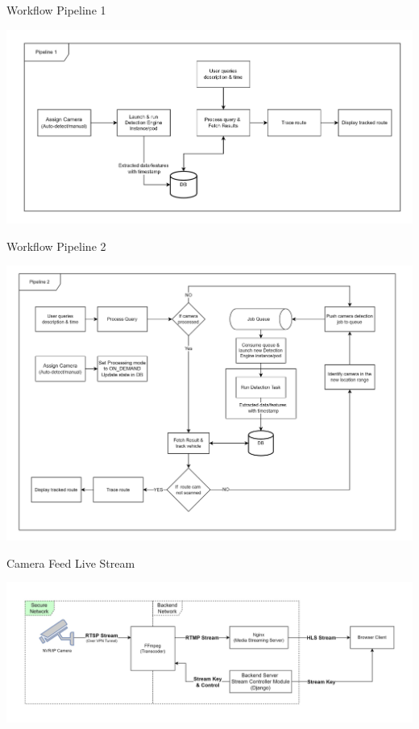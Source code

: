 \documentclass{beamer}
\begin{document}
	\begin{frame}{Workflow Pipeline 1}
		\begin{center}
			\includegraphics[width=\linewidth]{res/pipeline1}
		\end{center}
	\end{frame}

	\begin{frame}{Workflow Pipeline 2}
		\begin{center}
			\includegraphics[width=\linewidth]{res/pipeline2}
		\end{center}
	\end{frame}

	\begin{frame}{Camera Feed Live Stream}
		\begin{center}
			\includegraphics[width=\linewidth]{res/live_stream_arch.jpg}
		\end{center}
	\end{frame}
		
\end{document}
